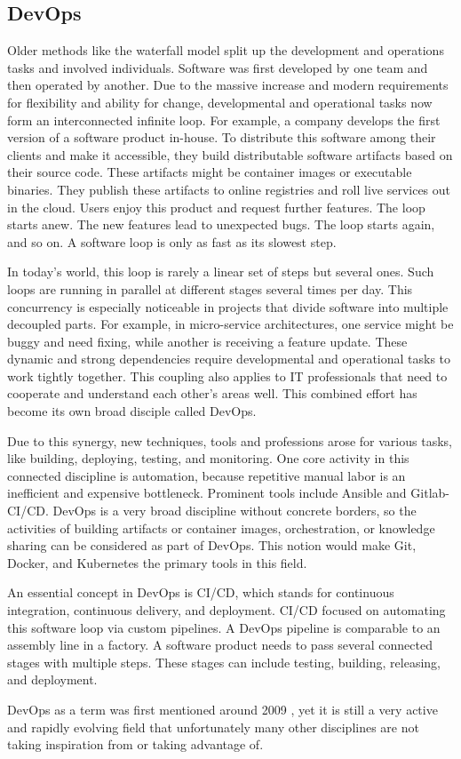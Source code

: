 
\subsection{DevOps}

Older methods like the waterfall model split up the development and operations tasks and involved individuals.
Software was first developed by one team and then operated by another.
Due to the massive increase and modern requirements for flexibility and ability for change,
developmental and operational tasks now form an interconnected infinite loop.
For example, a company develops the first version of a software product in-house.
To distribute this software among their clients and make it accessible, they
build distributable software artifacts based on their source code.
These artifacts might be container images or executable binaries.
They publish these artifacts to online registries and roll live services out in the cloud.
Users enjoy this product and request further features.
The loop starts anew.
The new features lead to unexpected bugs.
The loop starts again, and so on.
A software loop is only as fast as its slowest step.

In today's world, this loop is rarely a linear set of steps but several ones.
Such loops are running in parallel at different stages several times per day.
This concurrency is especially noticeable in projects that divide software into multiple decoupled parts.
For example, in micro-service architectures, one service might be buggy and need fixing,
while another is receiving a feature update.
These dynamic and strong dependencies require developmental and operational tasks
to work tightly together.
This coupling also applies to IT professionals that need to
cooperate and understand each other's areas well.
This combined effort has become its own broad disciple called DevOps.

Due to this synergy, new techniques, tools and professions arose 
for various tasks, like building, deploying, testing, and monitoring.
One core activity in this connected discipline is automation,
because repetitive manual labor is an inefficient and expensive bottleneck.
Prominent tools include Ansible and Gitlab-CI/CD.
DevOps is a very broad discipline without concrete borders,
so the activities of building artifacts or container images, orchestration, or knowledge sharing can be considered as part of DevOps.
This notion would make Git, Docker, and Kubernetes the primary tools in this field.

An essential concept in DevOps is CI/CD, which stands for continuous integration, continuous delivery, and deployment.
CI/CD focused on automating this software loop via custom pipelines.
A DevOps pipeline is comparable to an assembly line in a factory.
A software product needs to pass several connected stages with multiple steps.
These stages can include testing, building, releasing, and deployment.

DevOps as a term was first mentioned around 2009 \cite{paper:mlops}, yet it is still a very active and rapidly evolving field
that unfortunately many other disciplines are not taking inspiration from or taking advantage of.
